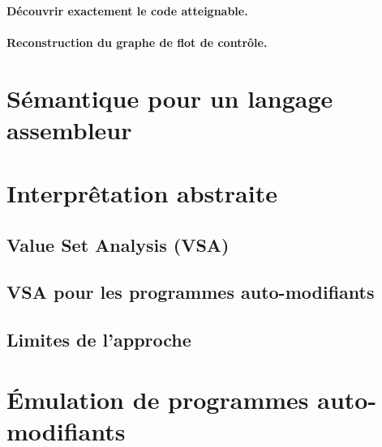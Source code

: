 
\paragraph{Découvrir exactement le code atteignable.}

\paragraph{Reconstruction du graphe de flot de contrôle.}

\section{Sémantique pour un langage assembleur}



\section{Interprêtation abstraite}

\subsection{Value Set Analysis (VSA)}

\subsection{VSA pour les programmes auto-modifiants}

\subsection{Limites de l'approche}

\section{Émulation de programmes auto-modifiants}
